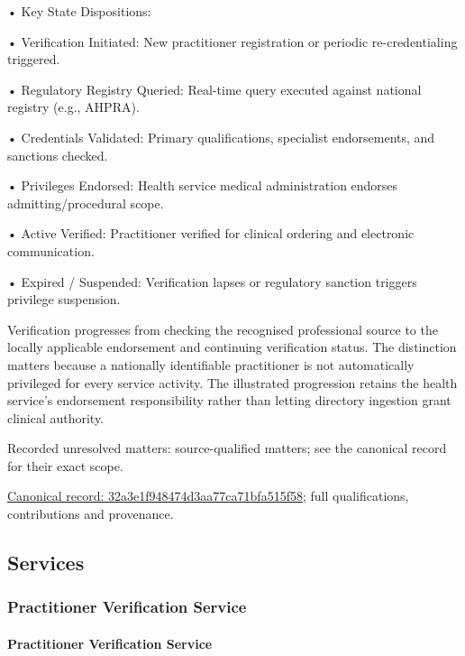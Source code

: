 •
Key State Dispositions:



•
Verification Initiated: New practitioner registration or periodic re-credentialing triggered.



•
Regulatory Registry Queried: Real-time query executed against national registry (e.g., AHPRA).



•
Credentials Validated: Primary qualifications, specialist endorsements, and sanctions checked.



•
Privileges Endorsed: Health service medical administration endorses admitting/procedural scope.



•
Active Verified: Practitioner verified for clinical ordering and electronic communication.



•
Expired / Suspended: Verification lapses or regulatory sanction triggers privilege suspension.



Verification progresses from checking the recognised professional source to the locally applicable endorsement and continuing verification status. The distinction matters because a nationally identifiable practitioner is not automatically privileged for every service activity. The illustrated progression retains the health service's endorsement responsibility rather than letting directory ingestion grant clinical authority.


{\small Recorded unresolved matters: source-qualified matters; see the canonical record for their exact scope.}\par
{\footnotesize \href{../../../../continuum/business/business-process/32a3e1f948474d3aa77ca71bfa515f58.md}{Canonical record: 32a3e1f948474d3aa77ca71bfa515f58}; full qualifications, contributions and provenance.}\par
\subsection{Services}

\subsubsection{Practitioner Verification Service}

\paragraph{Practitioner Verification Service}

